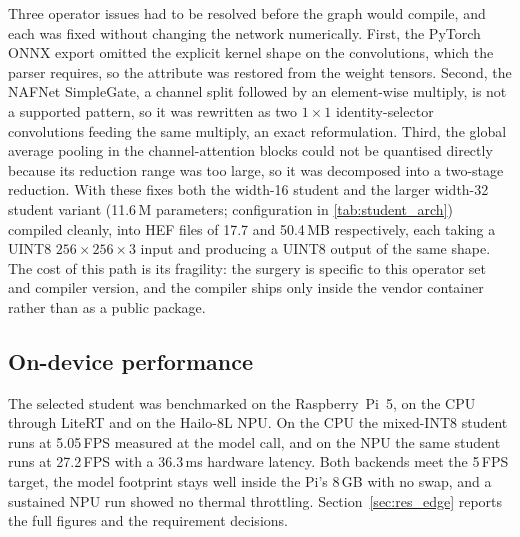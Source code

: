 Three operator issues had to be resolved before the graph would compile, and each was fixed without changing the network numerically. First, the PyTorch ONNX export omitted the explicit kernel shape on the convolutions, which the parser requires, so the attribute was restored from the weight tensors. Second, the NAFNet SimpleGate, a channel split followed by an element-wise multiply, is not a supported pattern, so it was rewritten as two $1\times1$ identity-selector convolutions feeding the same multiply, an exact reformulation. Third, the global average pooling in the channel-attention blocks could not be quantised directly because its reduction range was too large, so it was decomposed into a two-stage reduction. With these fixes both the width-16 student and the larger width-32 student variant (11.6\,M parameters; configuration in \autoref{tab:student_arch}) compiled cleanly, into HEF files of 17.7 and 50.4\,MB respectively, each taking a UINT8 $256\times256\times3$ input and producing a UINT8 output of the same shape. The cost of this path is its fragility: the surgery is specific to this operator set and compiler version, and the compiler ships only inside the vendor container rather than as a public package.

\subsection{On-device performance}
\label{sec:impl_ondevice}

The selected student was benchmarked on the Raspberry~Pi~5, on the CPU through LiteRT and on the Hailo-8L NPU. On the CPU the mixed-INT8 student runs at 5.05\,FPS measured at the model call, and on the NPU the same student runs at 27.2\,FPS with a 36.3\,ms hardware latency. Both backends meet the 5\,FPS target, the model footprint stays well inside the Pi's 8\,GB with no swap, and a sustained NPU run showed no thermal throttling. Section~\ref{sec:res_edge} reports the full figures and the requirement decisions.
